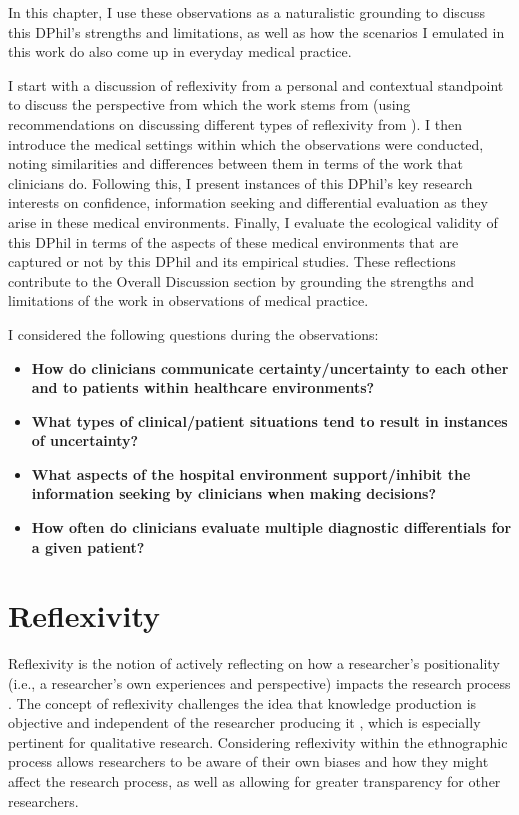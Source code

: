 \documentclass[a4paper, nobind]{templates/ociamthesis}
\providecommand{\tightlist}{%
  \setlength{\itemsep}{0pt}\setlength{\parskip}{0pt}}
\begin{document}
\hfill\break
In this chapter, I use these observations as a naturalistic grounding to discuss this DPhil's strengths and limitations, as well as how the scenarios I emulated in this work do also come up in everyday medical practice.

\hfill\break
I start with a discussion of reflexivity from a personal and contextual standpoint to discuss the perspective from which the work stems from (using recommendations on discussing different types of reflexivity from \autocite{olmos-vega_practical_2023}). I then introduce the medical settings within which the observations were conducted, noting similarities and differences between them in terms of the work that clinicians do. Following this, I present instances of this DPhil's key research interests on confidence, information seeking and differential evaluation as they arise in these medical environments. Finally, I evaluate the ecological validity of this DPhil in terms of the aspects of these medical environments that are captured or not by this DPhil and its empirical studies. These reflections contribute to the Overall Discussion section by grounding the strengths and limitations of the work in observations of medical practice.

\hfill\break
I considered the following questions during the observations:

\begin{itemize}
\tightlist
\item
  \textbf{How do clinicians communicate certainty/uncertainty to each other and to patients within healthcare environments?}
\item
  \textbf{What types of clinical/patient situations tend to result in instances of uncertainty?}
\item
  \textbf{What aspects of the hospital environment support/inhibit the information seeking by clinicians when making decisions?}
\item
  \textbf{How often do clinicians evaluate multiple diagnostic differentials for a given patient?}
\end{itemize}

\section{Reflexivity}\label{reflexivity}

Reflexivity is the notion of actively reflecting on how a researcher's positionality (i.e., a researcher's own experiences and perspective) impacts the research process \autocite{lazard2020}. The concept of reflexivity challenges the idea that knowledge production is objective and independent of the researcher producing it \autocite{berger2015}, which is especially pertinent for qualitative research. Considering reflexivity within the ethnographic process allows researchers to be aware of their own biases and how they might affect the research process, as well as allowing for greater transparency for other researchers.\\
\end{document}
